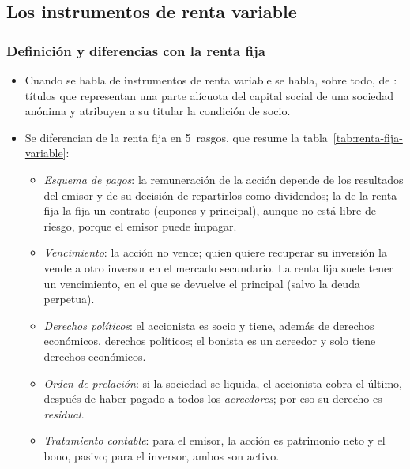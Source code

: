 \documentclass[11pt]{article}
\begin{document}
\subsection{Los instrumentos de renta variable}\label{sec:instrumentos}

\subsubsection{Definición y diferencias con la renta fija}\label{sec:definicion-rv}

\begin{itemize}
\item Cuando se habla de instrumentos de renta variable se habla, sobre todo, de : títulos que representan una parte alícuota del capital social de una sociedad anónima y atribuyen a su titular la condición de socio\nocite{LSC2010}.
\item Se diferencian de la renta fija en 5~rasgos, que resume la tabla~\ref{tab:renta-fija-variable}:
  \begin{itemize}
  \item \emph{Esquema de pagos}: la remuneración de la acción depende de los resultados del emisor y de su decisión de repartirlos como dividendos; la de la renta fija la fija un contrato (cupones y principal), aunque no está libre de riesgo, porque el emisor puede impagar.
  \item \emph{Vencimiento}: la acción no vence; quien quiere recuperar su inversión la vende a otro inversor en el mercado secundario. La renta fija suele tener un vencimiento, en el que se devuelve el principal (salvo la deuda perpetua).
  \item \emph{Derechos políticos}: el accionista es socio y tiene, además de derechos económicos, derechos políticos; el bonista es un acreedor y solo tiene derechos económicos.
  \item \emph{Orden de prelación}: si la sociedad se liquida, el accionista cobra el último, después de haber pagado a todos los \emph{acreedores}; por eso su derecho es \emph{residual}.
  \item \emph{Tratamiento contable}: para el emisor, la acción es patrimonio neto y el bono, pasivo; para el inversor, ambos son activo.
  \end{itemize}
\end{itemize}
\end{document}
